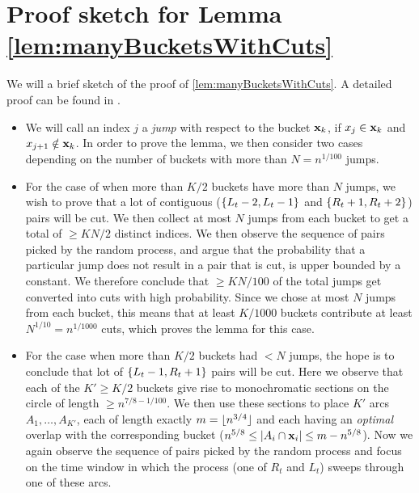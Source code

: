 \section{Proof sketch for Lemma \ref{lem:manyBucketsWithCuts}}

We will a brief sketch of the proof of \autoref{lem:manyBucketsWithCuts}. A detailed proof can be found in \cite{dmpy12}.

\begin{itemize}

\item We will call an index $j$ a \emph{jump} with respect to the bucket $\mathbf{x}_k$, if $x_j \in \mathbf{x}_k$ and $x_{j+1} \notin \mathbf{x}_k$. In order to prove the lemma, we then consider two cases depending on the number of buckets with more than $N = n^{1/100}$ jumps.

\item For the case of when more than $K/2$ buckets have more than $N$ jumps, we wish to prove that a lot of contiguous ($\left\{L_t - 2, L_t - 1\right\}$ and $\left\{R_t + 1, R_t + 2\right\}$) pairs will be cut. We then collect at most $N$ jumps from each bucket to get a total of $\geq KN/2$ distinct indices. We then observe the sequence of pairs picked by the random process, and argue that the probability that a particular jump does not result in a pair that is cut, is upper bounded by a constant. We therefore conclude that $\geq KN/100$ of the total jumps get converted into cuts with high probability. Since we chose at most $N$ jumps from each bucket, this means that at least $K/1000$ buckets contribute at least $N^{1/10} = n^{1/1000}$ cuts, which proves the lemma for this case.

\item For the case when more than $K/2$ buckets had $< N$ jumps, the hope is to conclude that lot of $\left\{L_t - 1, R_t + 1\right\}$ pairs will be cut. Here we observe that each of the $K' \geq K/2$ buckets give rise to monochromatic sections on the circle of length $\geq n^{7/8 - 1/100}$. We then use these sections to place $K'$ arcs $A_1,\ldots,A_{K'}$, each of length exactly $m = \lfloor n^{3/4} \rfloor$ and each having an \emph{optimal} overlap with the corresponding bucket ($n^{5/8} \leq \left| A_i \cap \mathbf{x}_i \right| \leq m - n^{5/8}$). Now we again observe the sequence of pairs picked by the random process and focus on the time window in which the process (one of $R_t$ and $L_t$) sweeps through one of these arcs.


\end{itemize}
